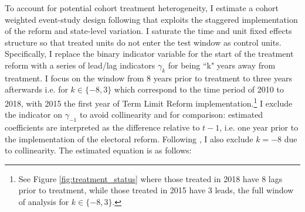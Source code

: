 \documentclass[12pt]{amsart}
\numberwithin{equation}{section}
\theoremstyle{definition}
\theoremstyle{definition}
\theoremstyle{definition}
\begin{document}
 To account for potential cohort treatment heterogeneity, I estimate    a cohort weighted event-study design following \citet{abraham_sun_2020} that exploits the staggered implementation of the reform and state-level variation. I saturate the time and unit fixed effects structure so that treated units do not enter the test window as control units. Specifically, I replace the binary indicator variable for the start of the treatment reform with a series of lead/lag indicators $\gamma_k$ for being ``k" years away from treatment. I focus on the window from 8 years prior to treatment to three years afterwards i.e. for $k \in \{-8,3\} $ which correspond to the time period of 2010 to 2018, with 2015 the first year of Term Limit Reform implementation.\footnote{See Figure \ref{fig:treatment_status} where those treated in 2018 have 8 lags prior to treatment, while those treated in 2015 have 3 leads, the full window of analysis for $k \in \{-8,3\} $.} %
I exclude the indicator on $\gamma_{-1}$ to avoid collinearity and for comparison: estimated coefficients are interpreted as the difference relative to $t-1$, i.e. one year prior to the implementation of the electoral reform. Following   \citet{abraham_sun_2020}, I also exclude $k=-8$ due to collinearity. The estimated equation is as follows:
\end{document}
